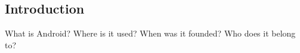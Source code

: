 \subsection{Introduction}\label{subsection:android-history}
What is Android? Where is it used? When was it founded? Who does it belong to?
